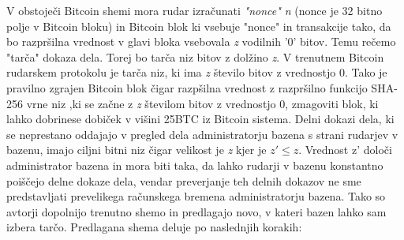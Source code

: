 \documentclass[12pt]{article}
\begin{document}
V obstoječi Bitcoin shemi mora rudar izračunati \textit{"nonce" n} (nonce je 32 bitno polje v Bitcoin bloku)  in Bitcoin blok ki vsebuje "nonce" in transakcije tako, da bo razpršilna vrednost v glavi bloka vsebovala \textit{z} vodilnih '0' bitov. Temu rečemo "tarča" dokaza dela. Torej bo tarča niz bitov z dolžino \textit{z}. V trenutnem Bitcoin rudarskem protokolu je tarča niz, ki ima \textit{z} število bitov z vrednostjo 0. Tako je pravilno zgrajen Bitcoin blok čigar razpšilna vrednost z razpršilno funkcijo SHA-256 vrne niz ,ki se začne z \textit{z} številom bitov z vrednostjo 0, zmagoviti blok, ki lahko dobrinese dobiček v višini 25BTC iz Bitcoin sistema. Delni dokazi dela, ki se neprestano oddajajo v pregled dela  administratorju bazena  s strani rudarjev v bazenu, imajo ciljni bitni niz čigar velikost je \textit{z} kjer je {$ z' \le z $}. Vrednost z' določi administrator bazena in mora biti taka, da lahko rudarji v bazenu konstantno poiščejo delne dokaze dela, vendar preverjanje teh delnih dokazov ne sme predstavljati prevelikega računskega bremena administratorju bazena. Tako so avtorji \cite{originalarticle} dopolnijo trenutno shemo in predlagajo novo, v kateri bazen lahko sam izbera tarčo. Predlagana shema deluje po naslednjih korakih:
\end{document}
